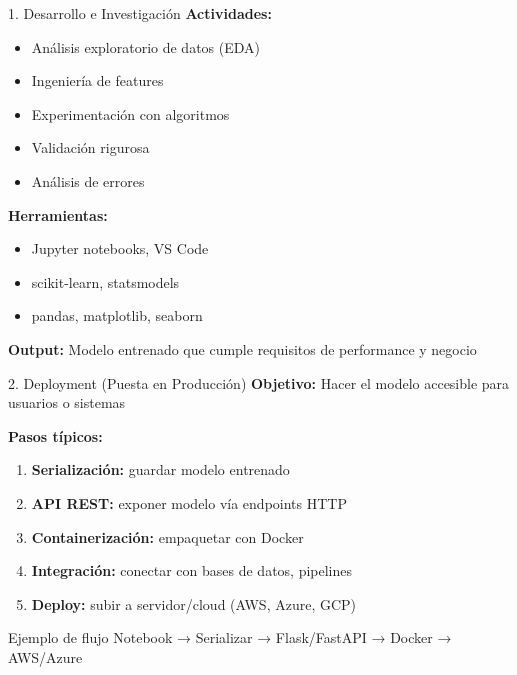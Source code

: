 \documentclass[aspectratio=169]{beamer}
\begin{document}
\begin{frame}{1. Desarrollo e Investigación}
\textbf{Actividades:}
\begin{itemize}
\item Análisis exploratorio de datos (EDA)
\item Ingeniería de features
\item Experimentación con algoritmos
\item Validación rigurosa
\item Análisis de errores
\end{itemize}

\vspace{0.3cm}

\textbf{Herramientas:}
\begin{itemize}
\item Jupyter notebooks, VS Code
\item scikit-learn, statsmodels
\item pandas, matplotlib, seaborn
\end{itemize}

\vspace{0.3cm}

\textbf{Output:} Modelo entrenado que cumple requisitos de performance y negocio
\end{frame}

\begin{frame}{2. Deployment (Puesta en Producción)}
\textbf{Objetivo:} Hacer el modelo accesible para usuarios o sistemas

\vspace{0.3cm}

\textbf{Pasos típicos:}
\begin{enumerate}
\item \textbf{Serialización:} guardar modelo entrenado
\item \textbf{API REST:} exponer modelo vía endpoints HTTP
\item \textbf{Containerización:} empaquetar con Docker
\item \textbf{Integración:} conectar con bases de datos, pipelines
\item \textbf{Deploy:} subir a servidor/cloud (AWS, Azure, GCP)
\end{enumerate}

\vspace{0.3cm}

\begin{exampleblock}{Ejemplo de flujo}
Notebook → Serializar → Flask/FastAPI → Docker → AWS/Azure
\end{exampleblock}
\end{frame}
\end{document}
